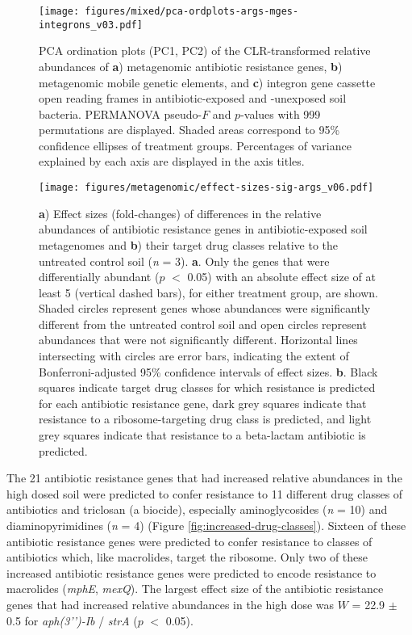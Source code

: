 \begin{figure}[htpb]
	\centering
		\texttt{[image: figures/mixed/pca-ordplots-args-mges-integrons\_v03.pdf]}
	\caption[PCA ordination plots of metagenomic antibiotic resistance genes, metagenomic mobile genetic elements, and integron gene cassette open reading frames.]{
		PCA ordination plots (PC1, PC2) of the CLR-transformed relative abundances of \textbf{a}) metagenomic antibiotic resistance genes, \textbf{b}) metagenomic mobile genetic elements, and \textbf{c}) integron gene cassette open reading frames in antibiotic-exposed and -unexposed soil bacteria.
		PERMANOVA pseudo-$F$ and $p$-values with 999 permutations are displayed.
		Shaded areas correspond to 95\% confidence ellipses of treatment groups.
		Percentages of variance explained by each axis are displayed in the axis titles.
	}
	\label{fig:pca-ordplots-args-mges-integrons}
\end{figure}

\begin{figure}[htpb]
	\centering
		\texttt{[image: figures/metagenomic/effect-sizes-sig-args\_v06.pdf]}
	\caption[Effect sizes of differentially abundant metagenomic antibiotic resistance genes and their target drug classes.]{
		\textbf{a}) Effect sizes (fold-changes) of differences in the relative abundances of antibiotic resistance genes in antibiotic-exposed soil metagenomes and \textbf{b}) their target drug classes relative to the untreated control soil (\textit{n} = 3).
		\textbf{a}. Only the genes that were differentially abundant ($p$ $<$ 0.05) with an absolute effect size of at least 5 (vertical dashed bars), for either treatment group, are shown.
		Shaded circles represent genes whose abundances were significantly different from the untreated control soil and open circles represent abundances that were not significantly different.
		Horizontal lines intersecting with circles are error bars, indicating the extent of Bonferroni-adjusted 95\% confidence intervals of effect sizes.
		\textbf{b}. Black squares indicate target drug classes for which resistance is predicted for each antibiotic resistance gene, dark grey squares indicate that resistance to a ribosome-targeting drug class is predicted, and light grey squares indicate that resistance to a beta-lactam antibiotic is predicted.
	}
	\label{fig:effect-sizes-sig-args}
\end{figure}

The 21 antibiotic resistance genes that had increased relative abundances in the high dosed soil were predicted to confer resistance to 11 different drug classes of antibiotics and triclosan (a biocide), especially aminoglycosides (\textit{n} = 10) and diaminopyrimidines (\textit{n} = 4) (Figure \ref{fig:increased-drug-classes}).
Sixteen of these antibiotic resistance genes were predicted to confer resistance to classes of antibiotics which, like macrolides, target the ribosome.
Only two of these increased antibiotic resistance genes were predicted to encode resistance to macrolides (\textit{mphE}, \textit{mexQ}).
The largest effect size of the antibiotic resistance genes that had increased relative abundances in the high dose was $W$ = 22.9 $\pm$ 0.5 for \textit{aph(3’’)-Ib} / \textit{strA} ($p$ $<$ 0.05).


